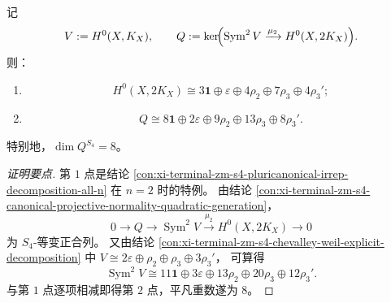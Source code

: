 \begin{conclusion}\label{con:xi-terminal-zm-s4-canonical-quadrics-equivariant-decomposition}
记
\[
V:=H^0(X,K_X),\qquad
Q:=\ker\!\Bigl(\operatorname{Sym}^2V\xrightarrow{\mu_2}H^0(X,2K_X)\Bigr).
\]
则：
\begin{enumerate}
  \item
  \[
  H^0(X,2K_X)\cong
  3\mathbf 1\oplus \varepsilon\oplus 4\rho_2\oplus 7\rho_3\oplus 4\rho_3';
  \]
  \item
  \[
  Q\cong
  8\mathbf 1\oplus 2\varepsilon\oplus 9\rho_2\oplus 13\rho_3\oplus 8\rho_3'.
  \]
\end{enumerate}
特别地，\(\dim Q^{S_4}=8\)。
\end{conclusion}
\begin{proof}[证明要点]
第 \(1\) 点是结论 \ref{con:xi-terminal-zm-s4-pluricanonical-irrep-decomposition-all-n} 在 \(n=2\) 时的特例。
由结论 \ref{con:xi-terminal-zm-s4-canonical-projective-normality-quadratic-generation}，
\[
0\to Q\to \operatorname{Sym}^2V\xrightarrow{\mu_2}H^0(X,2K_X)\to 0
\]
为 \(S_4\)-等变正合列。
又由结论 \ref{con:xi-terminal-zm-s4-chevalley-weil-explicit-decomposition} 中
\(V\cong 2\varepsilon\oplus\rho_2\oplus\rho_3\oplus 3\rho_3'\)，
可算得
\[
\operatorname{Sym}^2V\cong
11\mathbf 1\oplus 3\varepsilon\oplus 13\rho_2\oplus 20\rho_3\oplus 12\rho_3'.
\]
与第 \(1\) 点逐项相减即得第 \(2\) 点，平凡重数遂为 \(8\)。
\end{proof}






